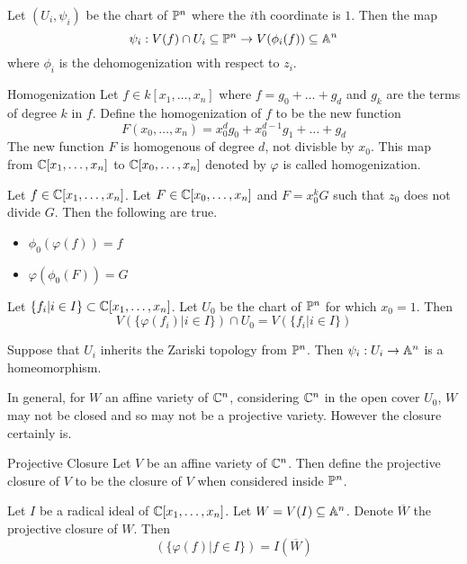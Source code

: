 \documentclass[a4paper]{article}
\begin{document}
\begin{thm}{}{} Let $(U_i,\psi_i)$ be the chart of $\mathbb{P}^n$ where the $i$th coordinate is $1$. Then the map $$\psi_i:V(f)\cap U_i\subseteq\mathbb{P}^n\to V(\phi_i(f))\subseteq\mathbb{A}^n$$ where $\phi_i$ is the dehomogenization with respect to $z_i$. 
\end{thm}

\begin{defn}{Homogenization}{} Let $f\in k[x_1,\dots,x_n]$ where $f=g_0+\dots+g_d$ and $g_k$ are the terms of degree $k$ in $f$. Define the homogenization of $f$ to be the new function $$F(x_0,\dots,x_n)=x_0^dg_0+x_0^{d-1}g_1+\dots+g_d$$ The new function $F$ is homogenous of degree $d$, not divisble by $x_0$. This map from $\mathbb{C}[x_1,\dots,x_n]$ to $\mathbb{C}[x_0,\dots,x_n]$ denoted by $\varphi$ is called homogenization. 
\end{defn}

\begin{thm}{}{} Let $f\in\mathbb{C}[x_1,\dots,x_n]$. Let $F\in\mathbb{C}[x_0,\dots,x_n]$ and $F=x_0^kG$ such that $z_0$ does not divide $G$. Then the following are true. 
\begin{itemize}
\item $\phi_0(\varphi(f))=f$
\item $\varphi(\phi_0(F))=G$
\end{itemize}
\end{thm}

\begin{lmm}{}{} Let $\{f_i|i\in I\}\subset\mathbb{C}[x_1,\dots,x_n]$. Let $U_0$ be the chart of $\mathbb{P}^n$ for which $x_0=1$. Then $$V(\{\varphi(f_i)|i\in I\})\cap U_0=V(\{f_i|i\in I\})$$
\end{lmm}

\begin{thm}{}{} Suppose that $U_i$ inherits the Zariski topology from $\mathbb{P}^n$. Then $\psi_i:U_i\to\mathbb{A}^n$ is a homeomorphism. 
\end{thm}

In general, for $W$ an affine variety of $\mathbb{C}^n$, considering $\mathbb{C}^n$ in the open cover $U_0$, $W$ may not be closed and so may not be a projective variety. However the closure certainly is. 

\begin{defn}{Projective Closure}{} Let $V$ be an affine variety of $\mathbb{C}^n$. Then define the projective closure of $V$ to be the closure of $V$ when considered inside $\mathbb{P}^n$. 
\end{defn}

\begin{prp}{}{} Let $I$ be a radical ideal of $\mathbb{C}[x_1,\dots,x_n]$. Let $W=V(I)\subseteq\mathbb{A}^n$. Denote $\overline{W}$ the projective closure of $W$. Then $$(\{\varphi(f)|f\in I\})=I(\overline{W})$$
\end{prp}
\end{document}
